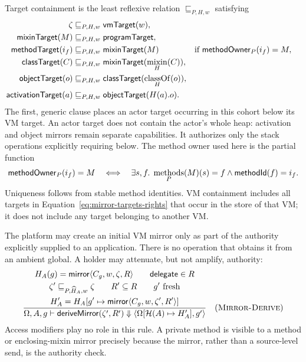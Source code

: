 Target containment is the least reflexive relation $\sqsubseteq_{P,H,w}$
satisfying
\begin{equation}\label{eq:mirror-target-containment}
\begin{aligned}
 \zeta&\sqsubseteq_{P,H,w}\mathsf{vmTarget}(w),\\
 \mathsf{mixinTarget}(M)&\sqsubseteq_{P,H,w}\mathsf{programTarget},\\
 \mathsf{methodTarget}(i_f)&\sqsubseteq_{P,H,w}\mathsf{mixinTarget}(M)
   &&\text{if }\mathsf{methodOwner}_P(i_f)=M,\\
 \mathsf{classTarget}(C)&\sqsubseteq_{P,H,w}
       \mathsf{mixinTarget}(\mathop{\mathrm{mixin}}_H(C)),\\
 \mathsf{objectTarget}(o)&\sqsubseteq_{P,H,w}
       \mathsf{classTarget}(\mathop{\mathrm{classOf}}_H(o)),\\
 \mathsf{activationTarget}(a)&\sqsubseteq_{P,H,w}
       \mathsf{objectTarget}(H(a).o).
\end{aligned}
\end{equation}
The first, generic clause places an actor target occurring in this cohort below
its VM target.  An actor target does not contain the actor's whole heap:
activation and object mirrors remain separate capabilities.  It authorizes
only the stack operations explicitly requiring  below.
The method owner used here is the partial function
\begin{equation}\label{eq:method-owner}
 \mathsf{methodOwner}_P(i_f)=M
 \quad\Longleftrightarrow\quad
 \exists s,f.\;\mathop{\mathrm{methods}}_P(M)(s)=f\land\mathsf{methodId}(f)=i_f.
\end{equation}
Uniqueness follows from stable method identities.  VM containment includes all
targets in Equation~\eqref{eq:mirror-targets-rights} that occur in the store of
that VM; it does not include any target belonging to another VM.

The platform may create an initial VM mirror only as part of the authority
explicitly supplied to an application.  There is no operation that obtains it
from an ambient global.  A holder may attenuate, but not amplify, authority:
\[
\dfrac{\begin{gathered}
 H_A(g)=\mathsf{mirror}\langle C_g,w,\zeta,R\rangle\qquad
 \mathsf{delegate}\in R\\
 \zeta'\sqsubseteq_{P,\widehat H_A,w}\zeta\qquad R'\subseteq R
 \qquad g'\text{ fresh}\\
 H_A'=H_A[g'\mapsto\mathsf{mirror}\langle C_g,w,\zeta',R'\rangle]
\end{gathered}}
 {\Omega,A,g\vdash\mathsf{deriveMirror}(\zeta',R')
       \Downarrow\langle\Omega[\mathcal H(A)\mapsto H_A'],g'\rangle}
\quad(\textsc{Mirror-Derive})
\]
Access modifiers play no role in this rule.  A private method is visible to a
method or enclosing-mixin mirror precisely because the mirror, rather than a
source-level send, is the authority check.

